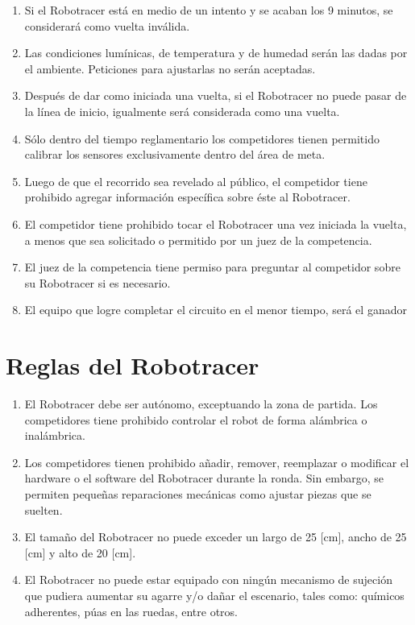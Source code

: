 \begin{enumerate}
  \item Si el Robotracer está en medio de un intento y se acaban los 9 minutos, se considerará como vuelta inválida.

  \item Las condiciones lumínicas, de temperatura y de humedad serán las dadas por el ambiente. Peticiones para ajustarlas no serán aceptadas.

  \item Después de dar como iniciada una vuelta, si el Robotracer no puede pasar de la línea de inicio, igualmente será considerada como una vuelta.

  \item Sólo dentro del tiempo reglamentario los competidores tienen permitido calibrar los sensores exclusivamente dentro del área de meta.

  \item Luego de que el recorrido sea revelado al público, el competidor tiene prohibido agregar información específica sobre éste al Robotracer.

  \item El competidor tiene prohibido tocar el Robotracer una vez iniciada la vuelta, a menos que sea solicitado o permitido por un juez de la competencia.

  \item El juez de la competencia tiene permiso para preguntar al competidor sobre su Robotracer si es necesario.

  \item El equipo que logre completar el circuito en el menor tiempo, será el ganador
\end{enumerate}


\section{Reglas del Robotracer}

\begin{enumerate}
  \item El Robotracer debe ser autónomo, exceptuando la zona de partida. Los competidores tiene prohibido controlar el robot de forma alámbrica o inalámbrica.

  \item Los competidores tienen prohibido añadir, remover, reemplazar o modificar el hardware o el software del Robotracer durante la ronda. Sin embargo, se permiten pequeñas reparaciones mecánicas como ajustar piezas que se suelten.

  \item El tamaño del Robotracer no puede exceder un largo de 25 [cm], ancho de 25 [cm] y alto de 20 [cm].

  \item El Robotracer no puede estar equipado con ningún mecanismo de sujeción que pudiera aumentar su agarre y/o dañar el escenario, tales como: químicos adherentes, púas en las ruedas, entre otros.
\end{enumerate}

